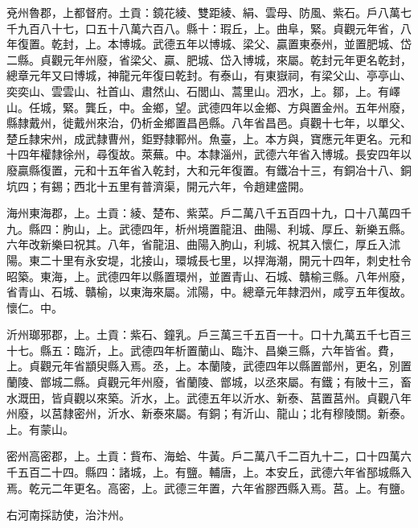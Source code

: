 \begin{pinyinscope}
 兗州魯郡，上都督府。土貢：鏡花綾、雙距綾、絹、雲母、防風、紫石。戶八萬七千九百八十七，口五十八萬六百八。縣十：瑕丘，上。曲阜，緊。貞觀元年省，八年復置。乾封，上。本博城。武德五年以博城、梁父、贏置東泰州，並置肥城、岱二縣。貞觀元年州廢，省梁父、贏、肥城、岱入博城，來屬。乾封元年更名乾封，總章元年又曰博城，神龍元年復曰乾封。有泰山，有東嶽祠，有梁父山、亭亭山、奕奕山、雲雲山、社首山、肅然山、石閭山、蒿里山。泗水，上。鄒，上。有嶧山。任城，緊。龔丘，中。金鄉，望。武德四年以金鄉、方與置金州。五年州廢，縣隸戴州，徙戴州來治，仍析金鄉置昌邑縣。八年省昌邑。貞觀十七年，以單父、楚丘隸宋州，成武隸曹州，鉅野隸鄆州。魚臺，上。本方與，寶應元年更名。元和十四年權隸徐州，尋復故。萊蕪。中。本隸淄州，武德六年省入博城。長安四年以廢贏縣復置，元和十五年省入乾封，大和元年復置。有鐵冶十三，有銅冶十八、銅坑四；有錫；西北十五里有普濟渠，開元六年，令趙建盛開。



 海州東海郡，上。土貢：綾、楚布、紫菜。戶二萬八千五百四十九，口十八萬四千九。縣四：朐山，上。武德四年，析州境置龍沮、曲陽、利城、厚丘、新樂五縣。六年改新樂曰祝其。八年，省龍沮、曲陽入朐山，利城、祝其入懷仁，厚丘入沭陽。東二十里有永安堤，北接山，環城長七里，以捍海潮，開元十四年，刺史杜令昭築。東海，上。武德四年以縣置環州，並置青山、石城、贛榆三縣。八年州廢，省青山、石城、贛榆，以東海來屬。沭陽，中。總章元年隸泗州，咸亨五年復故。懷仁。中。



 沂州瑯邪郡，上。土貢：紫石、鐘乳。戶三萬三千五百一十。口十九萬五千七百三十七。縣五：臨沂，上。武德四年析置蘭山、臨汴、昌樂三縣，六年皆省。費，上。貞觀元年省顓臾縣入焉。丞，上。本蘭陵，武德四年以縣置鄫州，更名，別置蘭陵、鄫城二縣。貞觀元年州廢，省蘭陵、鄫城，以丞來屬。有鐵；有陂十三，畜水溉田，皆貞觀以來築。沂水，上。武德五年以沂水、新泰、莒置莒州。貞觀八年州廢，以莒隸密州，沂水、新泰來屬。有銅；有沂山、龍山；北有穆陵關。新泰。上。有蒙山。



 密州高密郡，上。土貢：貲布、海蛤、牛黃。戶二萬八千二百九十二，口十四萬六千五百二十四。縣四：諸城，上。有鹽。輔唐，上。本安丘，武德六年省郚城縣入焉。乾元二年更名。高密，上。武德三年置，六年省膠西縣入焉。莒。上。有鹽。



 右河南採訪使，治汴州。



\end{pinyinscope}
